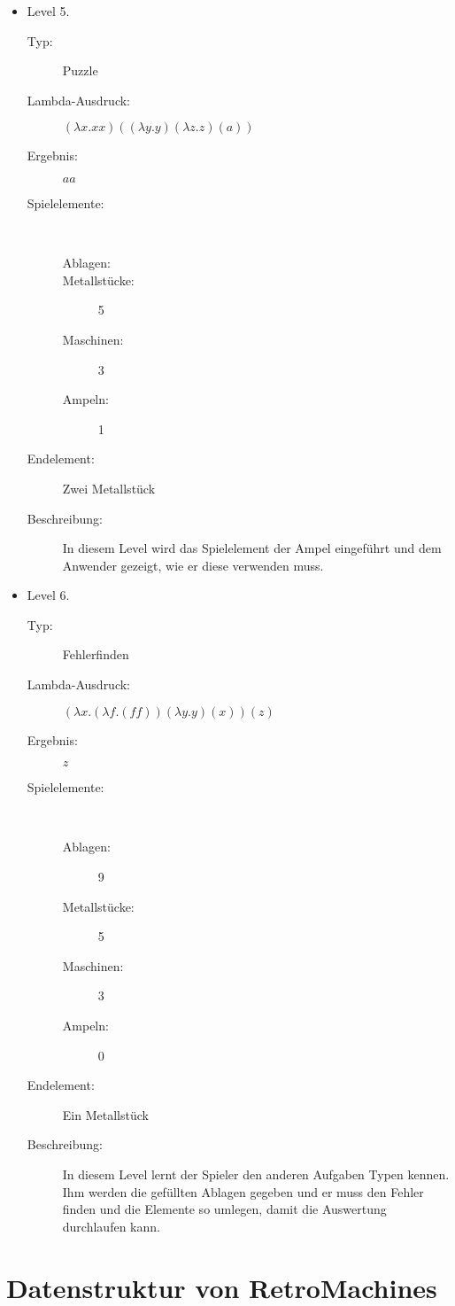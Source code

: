 \begin{itemize}
	\item{Level 5.}
	\begin{description}
		\item[Typ:] Puzzle
		\item[Lambda-Ausdruck:] $(\lambda x.xx)((\lambda y.y)(\lambda z.z)(a))$
		\item[Ergebnis:] $aa$
		\item[Spielelemente:]\ \linebreak[1]
		\begin{description}
			\item[Ablagen: ]
			\item[Metallstücke: ]5
			\item[Maschinen: ]3
			\item[Ampeln: ] 1
		\end{description}	
		\item[Endelement:] Zwei Metallstück
		\item[Beschreibung:] In diesem Level wird das Spielelement der Ampel eingeführt und dem Anwender gezeigt, wie er diese verwenden muss.
	\end{description}
	
	\item{Level 6.}
	\begin{description}
		\item[Typ:] Fehlerfinden
		\item[Lambda-Ausdruck:] $(\lambda x.(\lambda f.(ff))(\lambda y.y)(x))(z)$
		\item[Ergebnis:] $z$
		\item[Spielelemente:]\ \linebreak[1]
		\begin{description}
			\item[Ablagen: ]9
			\item[Metallstücke: ]5
			\item[Maschinen: ]3
			\item[Ampeln: ] 0
		\end{description}	
		\item[Endelement:] Ein Metallstück
		\item[Beschreibung:] In diesem Level lernt der Spieler den anderen Aufgaben Typen kennen. Ihm werden die gefüllten Ablagen gegeben und er muss den Fehler finden und die Elemente so umlegen, damit die Auswertung durchlaufen kann. 
	\end{description}
\end{itemize}

\chapter{Datenstruktur von RetroMachines}

